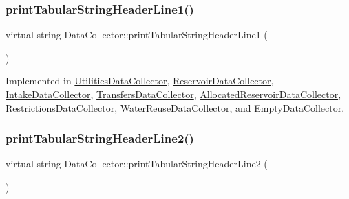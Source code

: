 \mbox{\label{classDataCollector_a91619cfa9e9b8cefd2f7c20d5718b41e}} 
\subsubsection{\texorpdfstring{print\+Tabular\+String\+Header\+Line1()}{printTabularStringHeaderLine1()}}
{\footnotesize\ttfamily virtual string Data\+Collector\+::print\+Tabular\+String\+Header\+Line1 (\begin{DoxyParamCaption}{ }\end{DoxyParamCaption})\hspace{0.3cm}{\ttfamily [pure virtual]}}



Implemented in \mbox{\hyperlink{classUtilitiesDataCollector_a796aa9d7637d8ed04dbd949ca2a34088}{Utilities\+Data\+Collector}}, \mbox{\hyperlink{classReservoirDataCollector_a62e7c7abc34c8154b338dfbd284ed665}{Reservoir\+Data\+Collector}}, \mbox{\hyperlink{classIntakeDataCollector_ae17ab7e6c75e77f5981f6a682597bb5c}{Intake\+Data\+Collector}}, \mbox{\hyperlink{classTransfersDataCollector_a7c797fbccf4326b206b29529059dd622}{Transfers\+Data\+Collector}}, \mbox{\hyperlink{classAllocatedReservoirDataCollector_ae82c7a68af1dce9003cccc6da1800e28}{Allocated\+Reservoir\+Data\+Collector}}, \mbox{\hyperlink{classRestrictionsDataCollector_a2676a6693b254997d223fc1c437258ab}{Restrictions\+Data\+Collector}}, \mbox{\hyperlink{classWaterReuseDataCollector_a1065ad3627b913dccb6ecbf0e6acc6e6}{Water\+Reuse\+Data\+Collector}}, and \mbox{\hyperlink{classEmptyDataCollector_afa47b48abb2ed59c16f1253e55f93cf2}{Empty\+Data\+Collector}}.

\mbox{\label{classDataCollector_af01ea961314be2164f39e6d4cd59e443}} 
\subsubsection{\texorpdfstring{print\+Tabular\+String\+Header\+Line2()}{printTabularStringHeaderLine2()}}
{\footnotesize\ttfamily virtual string Data\+Collector\+::print\+Tabular\+String\+Header\+Line2 (\begin{DoxyParamCaption}{ }\end{DoxyParamCaption})\hspace{0.3cm}{\ttfamily [pure virtual]}}



